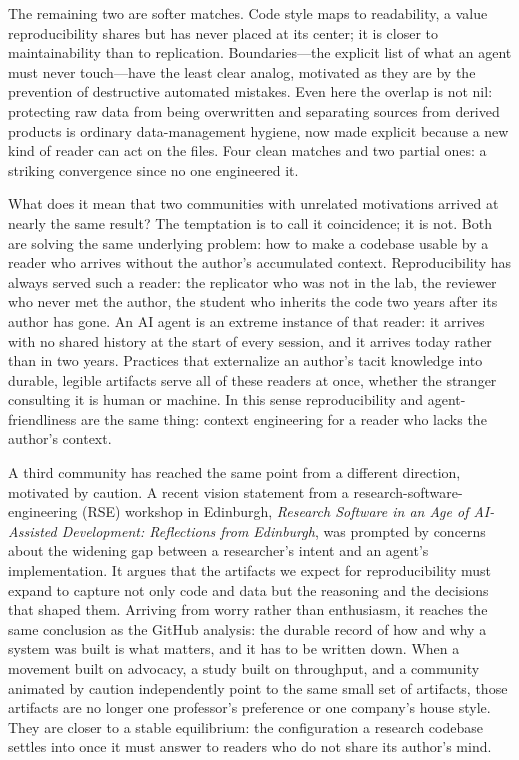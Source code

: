 \documentclass{IEEEcsmag}
\begin{document}
The remaining two are softer matches. Code style maps to readability, a value reproducibility shares but has never placed at its center; it is closer to maintainability than to replication. Boundaries---the explicit list of what an agent must never touch---have the least clear analog, motivated as they are by the prevention of destructive automated mistakes. Even here the overlap is not nil: protecting raw data from being overwritten and separating sources from derived products is ordinary data-management hygiene, now made explicit because a new kind of reader can act on the files. Four clean matches and two partial ones: a striking convergence since no one engineered it.

What does it mean that two communities with unrelated motivations arrived at nearly the same result? The temptation is to call it coincidence; it is not. Both are solving the same underlying problem: how to make a codebase usable by a reader who arrives without the author's accumulated context. Reproducibility has always served such a reader: the replicator who was not in the lab, the reviewer who never met the author, the student who inherits the code two years after its author has gone. An AI agent is an extreme instance of that reader: it arrives with no shared history at the start of every session, and it arrives today rather than in two years. Practices that externalize an author's tacit knowledge into durable, legible artifacts serve all of these readers at once, whether the stranger consulting it is human or machine. In this sense reproducibility and agent-friendliness are the same thing: context engineering for a reader who lacks the author's context.

A third community has reached the same point from a different direction, motivated by caution. A recent vision statement from a research-software-engineering (RSE) workshop in Edinburgh, \emph{Research Software in an Age of AI-Assisted Development: Reflections from Edinburgh},\cite{katz2026} was prompted by concerns about the widening gap between a researcher's intent and an agent's implementation. It argues that the artifacts we expect for reproducibility must expand to capture not only code and data but the reasoning and the decisions that shaped them. Arriving from worry rather than enthusiasm, it reaches the same conclusion as the GitHub analysis: the durable record of how and why a system was built is what matters, and it has to be written down. When a movement built on advocacy, a study built on throughput, and a community animated by caution independently point to the same small set of artifacts, those artifacts are no longer one professor's preference or one company's house style. They are closer to a stable equilibrium: the configuration a research codebase settles into once it must answer to readers who do not share its author's mind.
\end{document}
